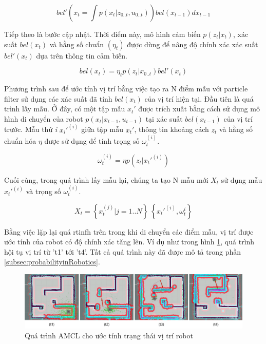 {\begin{equation}
  bel'({x}_{t} = \int p\left({x}_ {t}|{z}_{0..t}, {u}_{0..t}\right))bel\left({x}_{t-1}\right)d{x}_{t-1}
\end{equation}

Tiếp theo là bước cập nhật. Thời điểm này, mô hình cảm biến $p\left({z}_{t}|{x}_{t}\right)$, xác suất $bel\left({x}_{t}\right)$ và hằng số chuẩn $\left({\eta}_{t}\right)$ được dùng để nâng độ chính xác xác suất $bel'\left({x}_{t}\right)$ dựa trên thông tin cảm biến.

\begin{equation}
  bel({x}_{t}) = {\eta}_{t} p\left({z}_ {t}|{x}_{0..t}\right)bel'({x}_{t})
\end{equation}

Phương trình sau để ước tính vị trí bằng việc tạo ra N điểm mẫu với particle filter sử dụng các xác suất đã tính $bel({x}_{t})$ của vị trí hiện tại. Đầu tiên là quá trình lấy mẫu. Ở đây, có một tập mẫu ${x}_{t}'$ được trích xuất bằng cách sử dụng mô hình di chuyển của robot $p\left({x}_{t}|{x}_{t-1}, {u}_{t-1}\right)$ tại xác suất $bel({x}_{t-1})$ của vị trí trước. Mẫu thứ \textit{i} ${{x}_{i}'}^{(i)}$ giữa tập mẫu ${x}_{t}'$, thông tin khoảng cách ${z}_{t}$ và hằng số chuẩn hóa $\eta$ được sử dụng để tính trọng số ${\omega}_{t}^{(i)}$.

\begin{equation}
  {\omega}_{t}^{(i)} = {\eta}p\left({z}_{t}|{x}_{t}'^{(i)}\right)
\end{equation}

Cuối cùng, trong quá trình lấy mẫu lại, chúng ta tạo N mẫu mới ${X}_{t}$ sử dụng mẫu ${{x}_{t}'}^{(i)}$ và trọng số ${\omega}_{t}^{(i)}$.

\begin{equation}
  X_t = \left\{x_t^{(j)} | j = 1..N\right\} ~  \left\{x_t'^{(i)}, {\omega}_t^{i}\right\}
\end{equation}

Bằng việc lặp lại quá rtinfh trên trong khi di chuyển các điểm mẫu, vị trí được ước tính của robot có độ chính xác tăng lên. Ví dụ như trong hình \figurename{\ref{fig:AMCLprocess}}, quá trình hội tụ vị trí từ 't1' tới 't4'. Tất cả quá trình này đã được mô tả trong phần \ref{subsec:probabilityinRobotics}. \cite{pyo2017ros}

\begin{figure}[htbp]
  \centering
  \includegraphics[width=1\linewidth]{figures/AMCL-process-for-pose-estimate.png}
  \caption{Quá trình AMCL cho ước tính trạng thái vị trí robot}
  \label{fig:AMCLprocess}
\end{figure}

}

